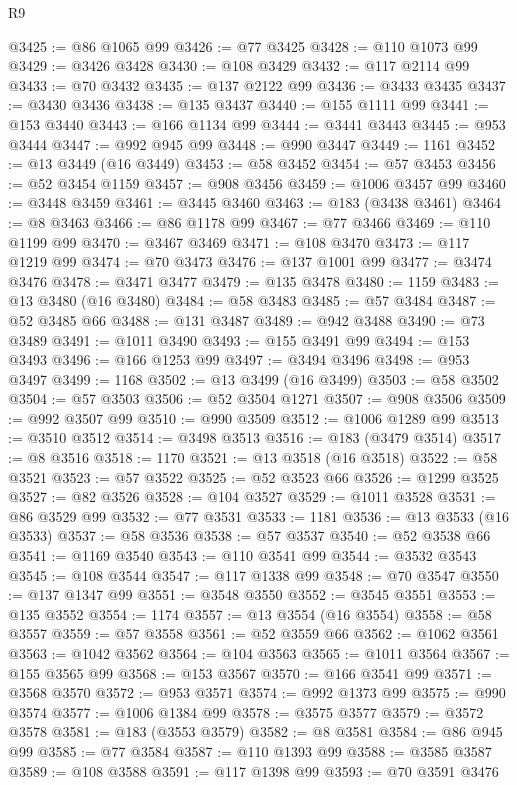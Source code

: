 \begin{lexlean}{R9}
\begin{coremodule}
@3425 := @86 @1065 @99
@3426 := @77 @3425
@3428 := @110 @1073 @99
@3429 := @3426 @3428
@3430 := @108 @3429
@3432 := @117 @2114 @99
@3433 := @70 @3432
@3435 := @137 @2122 @99
@3436 := @3433 @3435
@3437 := @3430 @3436
@3438 := @135 @3437
@3440 := @155 @1111 @99
@3441 := @153 @3440
@3443 := @166 @1134 @99
@3444 := @3441 @3443
@3445 := @953 @3444
@3447 := @992 @945 @99
@3448 := @990 @3447
@3449 := 1161
@3452 := @13 @3449 (@16 @3449)
@3453 := @58 @3452
@3454 := @57 @3453
@3456 := @52 @3454 @1159
@3457 := @908 @3456
@3459 := @1006 @3457 @99
@3460 := @3448 @3459
@3461 := @3445 @3460
@3463 := @183 (@3438 @3461)
@3464 := @8 @3463
@3466 := @86 @1178 @99
@3467 := @77 @3466
@3469 := @110 @1199 @99
@3470 := @3467 @3469
@3471 := @108 @3470
@3473 := @117 @1219 @99
@3474 := @70 @3473
@3476 := @137 @1001 @99
@3477 := @3474 @3476
@3478 := @3471 @3477
@3479 := @135 @3478
@3480 := 1159
@3483 := @13 @3480 (@16 @3480)
@3484 := @58 @3483
@3485 := @57 @3484
@3487 := @52 @3485 @66
@3488 := @131 @3487
@3489 := @942 @3488
@3490 := @73 @3489
@3491 := @1011 @3490
@3493 := @155 @3491 @99
@3494 := @153 @3493
@3496 := @166 @1253 @99
@3497 := @3494 @3496
@3498 := @953 @3497
@3499 := 1168
@3502 := @13 @3499 (@16 @3499)
@3503 := @58 @3502
@3504 := @57 @3503
@3506 := @52 @3504 @1271
@3507 := @908 @3506
@3509 := @992 @3507 @99
@3510 := @990 @3509
@3512 := @1006 @1289 @99
@3513 := @3510 @3512
@3514 := @3498 @3513
@3516 := @183 (@3479 @3514)
@3517 := @8 @3516
@3518 := 1170
@3521 := @13 @3518 (@16 @3518)
@3522 := @58 @3521
@3523 := @57 @3522
@3525 := @52 @3523 @66
@3526 := @1299 @3525
@3527 := @82 @3526
@3528 := @104 @3527
@3529 := @1011 @3528
@3531 := @86 @3529 @99
@3532 := @77 @3531
@3533 := 1181
@3536 := @13 @3533 (@16 @3533)
@3537 := @58 @3536
@3538 := @57 @3537
@3540 := @52 @3538 @66
@3541 := @1169 @3540
@3543 := @110 @3541 @99
@3544 := @3532 @3543
@3545 := @108 @3544
@3547 := @117 @1338 @99
@3548 := @70 @3547
@3550 := @137 @1347 @99
@3551 := @3548 @3550
@3552 := @3545 @3551
@3553 := @135 @3552
@3554 := 1174
@3557 := @13 @3554 (@16 @3554)
@3558 := @58 @3557
@3559 := @57 @3558
@3561 := @52 @3559 @66
@3562 := @1062 @3561
@3563 := @1042 @3562
@3564 := @104 @3563
@3565 := @1011 @3564
@3567 := @155 @3565 @99
@3568 := @153 @3567
@3570 := @166 @3541 @99
@3571 := @3568 @3570
@3572 := @953 @3571
@3574 := @992 @1373 @99
@3575 := @990 @3574
@3577 := @1006 @1384 @99
@3578 := @3575 @3577
@3579 := @3572 @3578
@3581 := @183 (@3553 @3579)
@3582 := @8 @3581
@3584 := @86 @945 @99
@3585 := @77 @3584
@3587 := @110 @1393 @99
@3588 := @3585 @3587
@3589 := @108 @3588
@3591 := @117 @1398 @99
@3593 := @70 @3591 @3476

\end{coremodule}
\end{lexlean}
